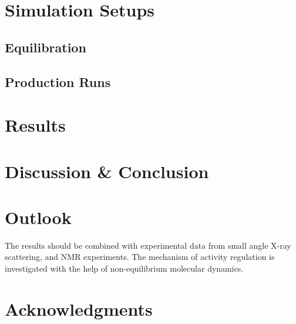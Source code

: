 \documentclass[english, a4paper, 12pt, titlepage, draft]{article}
\begin{document}
\section{Simulation Setups}
\subsection{Equilibration}
\subsection{Production Runs}



\section{Results}



\section{Discussion \& Conclusion}



\section{Outlook}
The results should be combined with experimental data from small angle X-ray scattering, and NMR experiments. The mechanism of activity regulation is investigated with the help of non-equilibrium molecular dynamics.



\section{Acknowledgments}



\singlespacing
\small



 
\end{document}
